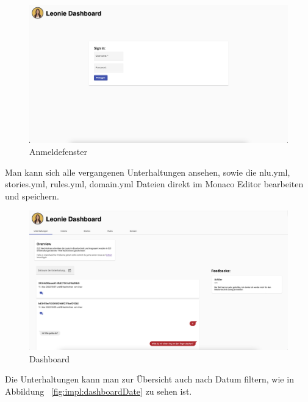 \begin{figure}[hbt!]
    \centering
    \includegraphics[scale=0.25]{pics/signin}
    \caption{Anmeldefenster}
    \label{fig:impl:signin}
\end{figure}

Man kann sich alle vergangenen Unterhaltungen ansehen, sowie die nlu.yml, stories.yml, rules.yml, domain.yml Dateien direkt im Monaco Editor bearbeiten und speichern.

\begin{figure}[hbt!]
    \centering
    \includegraphics[scale=0.25]{pics/dashboardConvo}
    \caption{Dashboard}
    \label{fig:impl:dashConv}
\end{figure}

Die Unterhaltungen kann man zur Übersicht auch nach Datum filtern, wie in Abbildung ~\ref{fig:impl:dashboardDate} zu sehen ist.

